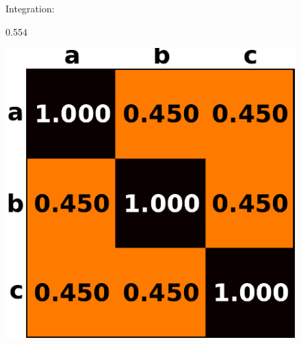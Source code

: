 \documentclass[5p]{elsarticle}
\begin{document}
\begin{figure}
\hspace*{2ex}%
\begin{minipage}{.19\linewidth}
    \center\sffamily
    {\small Integration:}

    0.554
\end{minipage}%
\begin{minipage}{.2\linewidth}
    \includegraphics[width=1.07\linewidth]{correlation_ex1.pdf}
\end{minipage}%
\hfill%
\begin{minipage}{.033\linewidth}
    \rule{0pt}{6.487\linewidth}%

\end{minipage}
\end{figure}
\end{document}
